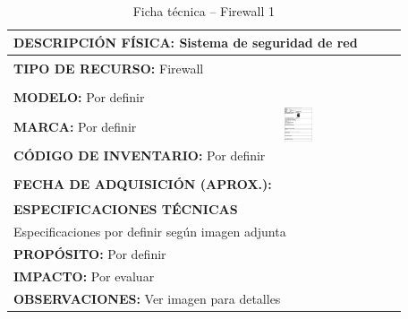 \begin{table}[H]
\centering
\caption{Ficha técnica -- Firewall 1}
\label{tab:firewall-1}
\begin{tabular}{|p{}|p{}|}
\hline
\multicolumn{2}{|l|}{\textbf{DESCRIPCIÓN FÍSICA:} Sistema de seguridad de red} \\ \hline
\textbf{TIPO DE RECURSO:} Firewall & 
\multirow{5}{*}{\includegraphics[width=0.25\textwidth,height=4cm,keepaspectratio]{tablas-images/cp1/firewall/firewall.png}} \\ \cline{1-1}
\textbf{MODELO:} Por definir & \\ \cline{1-1}
\textbf{MARCA:} Por definir & \\ \cline{1-1}
\textbf{CÓDIGO DE INVENTARIO:} Por definir & \\ \cline{1-1}
\textbf{FECHA DE ADQUISICIÓN (APROX.):} & \\ \hline
\multicolumn{2}{|l|}{\textbf{ESPECIFICACIONES TÉCNICAS}} \\ \hline
\multicolumn{2}{|p{0.95\textwidth}|}{
\footnotesize
Especificaciones por definir según imagen adjunta
} \\ \hline
\multicolumn{2}{|l|}{\textbf{PROPÓSITO:} Por definir} \\ \hline
\multicolumn{2}{|l|}{\textbf{IMPACTO:} Por evaluar} \\ \hline
\multicolumn{2}{|l|}{\textbf{OBSERVACIONES:} Ver imagen para detalles} \\ \hline
\end{tabular}
\end{table}
